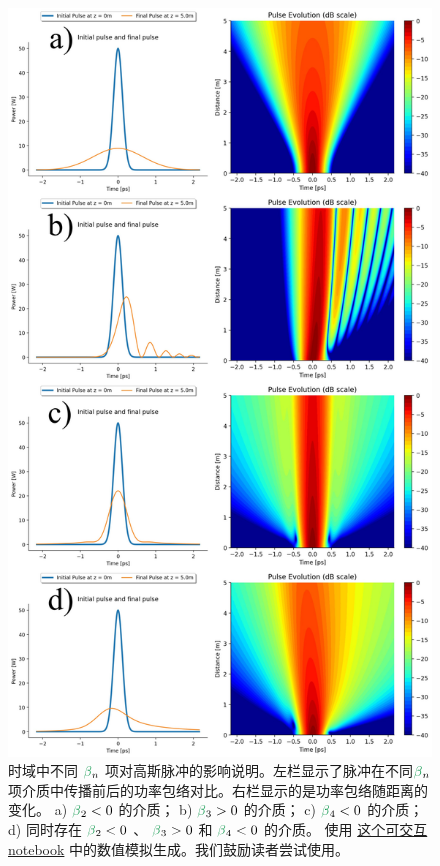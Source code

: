 \begin{figure}
    \centering
    \includegraphics[width=0.75\linewidth]{figures/dispersion_combined.png}
    \caption{时域中不同 $\betag_n$ 项对高斯脉冲的影响说明。左栏显示了脉冲在不同$\betag_n$项介质中传播前后的功率包络对比。右栏显示的是功率包络随距离的变化。  a) $\betag_2<0$ 的介质； b) $\betag_3>0$ 的介质； c) $\betag_4<0$ 的介质； d) 同时存在 $\betag_2<0$ 、 $\betag_3>0$ 和 $\betag_4<0$ 的介质。
    使用 \href{https://colab.research.google.com/drive/1PW9smFA3PECvcXyWpZcW1ogY4W3hEYFt?usp=sharing}{这个可交互notebook} 中的数值模拟生成。我们鼓励读者尝试使用。}
    \label{fig:dispersion_combined}
\end{figure}